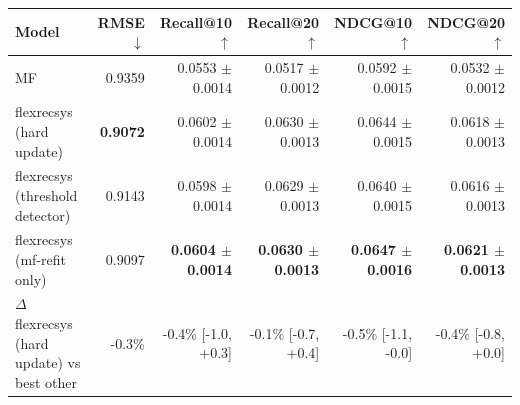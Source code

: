 \begin{tabular}{lrrrrr}
\toprule
Model & RMSE $\downarrow$ & Recall@10 $\uparrow$ & Recall@20 $\uparrow$ & NDCG@10 $\uparrow$ & NDCG@20 $\uparrow$ \\
\midrule
MF & 0.9359 & 0.0553 $\pm$ 0.0014 & 0.0517 $\pm$ 0.0012 & 0.0592 $\pm$ 0.0015 & 0.0532 $\pm$ 0.0012 \\
flexrecsys (hard update) & \textbf{0.9072} & 0.0602 $\pm$ 0.0014 & 0.0630 $\pm$ 0.0013 & 0.0644 $\pm$ 0.0015 & 0.0618 $\pm$ 0.0013 \\
flexrecsys (threshold detector) & 0.9143 & 0.0598 $\pm$ 0.0014 & 0.0629 $\pm$ 0.0013 & 0.0640 $\pm$ 0.0015 & 0.0616 $\pm$ 0.0013 \\
flexrecsys (mf-refit only) & 0.9097 & \textbf{0.0604 $\pm$ 0.0014} & \textbf{0.0630 $\pm$ 0.0013} & \textbf{0.0647 $\pm$ 0.0016} & \textbf{0.0621 $\pm$ 0.0013} \\
\midrule
$\Delta$ flexrecsys (hard update) vs best other & -0.3\% & -0.4\% [-1.0, +0.3] & -0.1\% [-0.7, +0.4] & -0.5\% [-1.1, -0.0] & -0.4\% [-0.8, +0.0] \\
\bottomrule
\end{tabular}
